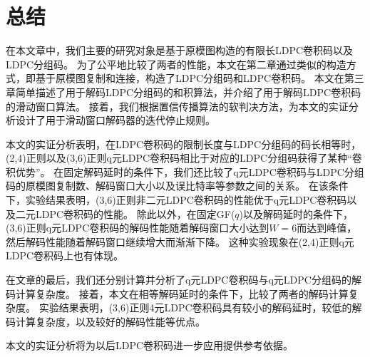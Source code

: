 \chapter{总结}
在本文章中，我们主要的研究对象是基于原模图构造的有限长LDPC卷积码以及LDPC分组码。
为了公平地比较了两者的性能，本文在第二章通过类似的构造方式，即基于原模图复制和连接，构造了LDPC分组码和LDPC卷积码。
本文在第三章简单描述了用于解码LDPC分组码的和积算法，并介绍了用于解码LDPC卷积码的滑动窗口算法。
接着，我们根据置信传播算法的软判决方法，为本文的实证分析设计了用于滑动窗口解码器的迭代停止规则。

本文的实证分析表明，在LDPC卷积码的限制长度与LDPC分组码的码长相等时，(2,4)正则以及(3,6)正则q元LDPC卷积码相比于对应的LDPC分组码获得了某种“卷积优势”。
在固定解码延时的条件下，我们还比较了q元LDPC卷积码与LDPC分组码的原模图复制数、解码窗口大小以及误比特率等参数之间的关系。
在该条件下，实验结果表明，(3,6)正则非二元LDPC卷积码的性能优于q元LDPC卷积码以及二元LDPC卷积码的性能。
除此以外，在固定GF($q$)以及解码延时的条件下，(3,6)正则q元LDPC卷积码的解码性能随着解码窗口大小达到$W=6$而达到峰值，然后解码性能随着解码窗口继续增大而渐渐下降。
这种实验现象在(2,4)正则q元LDPC卷积码上也有体现。

在文章的最后，我们还分别计算并分析了q元LDPC卷积码与q元LDPC分组码的解码计算复杂度。
接着，本文在相等解码延时的条件下，比较了两者的解码计算复杂度。
实验结果表明，(3,6)正则4元LDPC卷积码具有较小的解码延时，较低的解码计算复杂度，以及较好的解码性能等优点。

本文的实证分析将为以后LDPC卷积码进一步应用提供参考依据。


















